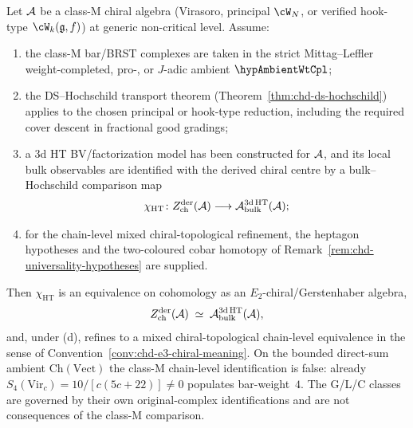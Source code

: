 \begin{corollary}%
\label{cor:universal-holography-class-M}%
%
Let $\mathcal{A}$ be a class-M chiral algebra
\textup{(}Virasoro, principal $\cW_N$, or verified hook-type
$\cW_k(\fg,f)$\textup{)} at generic non-critical level.  Assume:
\begin{enumerate}[label=\textup{(\alph*)}]
\item the class-M bar/BRST complexes are taken in the strict
Mittag--Leffler weight-completed, pro-, or $J$-adic ambient
\(\hypAmbientWtCpl\);
\item the DS--Hochschild transport theorem
\textup{(}Theorem~\ref{thm:chd-ds-hochschild}\textup{)} applies to the
chosen principal or hook-type reduction, including the required cover
descent in fractional good gradings;
\item a 3d HT BV/factorization model has been constructed for
\(\mathcal{A}\), and its local bulk observables are identified with the
derived chiral centre by a bulk--Hochschild comparison map
\[
\chi_{\mathrm{HT}}\colon
 Z^{\mathrm{der}}_{\mathrm{ch}}(\mathcal{A})
 \longrightarrow
 \mathcal A_{\mathrm{bulk}}^{\mathrm{3d\,HT}}(\mathcal{A});
\]
\item for the chain-level mixed chiral-topological refinement, the
heptagon hypotheses and the two-coloured cobar homotopy of
Remark~\ref{rem:chd-universality-hypotheses} are supplied.
\end{enumerate}
Then \(\chi_{\mathrm{HT}}\) is an equivalence on cohomology as an
\(E_2\)-chiral/Gerstenhaber algebra,
\[
 Z^{\mathrm{der}}_{\mathrm{ch}}(\mathcal{A}) \;\simeq\;
 \mathcal{A}_{\mathrm{bulk}}^{\mathrm{3d\,HT}}(\mathcal{A}),
\]
and, under \textup{(d)}, refines to a mixed chiral-topological
chain-level equivalence in the sense of
Convention~\ref{conv:chd-e3-chiral-meaning}. On the bounded
direct-sum ambient $\mathrm{Ch}(\mathrm{Vect})$ the class-M
chain-level identification is false: already
$S_4(\mathrm{Vir}_c)=10/[c(5c+22)]\ne0$ populates bar-weight~$4$.
The G/L/C classes are governed by their own original-complex
identifications and are not consequences of the class-M comparison.
\end{corollary}


